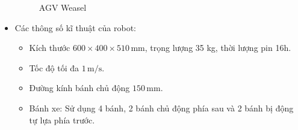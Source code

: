 \begin{itemize}
\begin{figure}[H]
                \caption{AGV Weasel}
                \label{chap1_pic12}
            \end{figure}
            \item Các thông số kĩ thuật của robot:
                \begin{itemize}[label=\textendash]
                    \item Kích thước $600 \times 400 \times 510 \,\mathrm{mm}$, trọng lượng 35 kg, thời lượng pin 16h.
                    \item Tốc độ tối đa $1 \,\mathrm{m/s}$.
                    \item Đường kính bánh chủ động $150 \,\mathrm{mm}$.
                    \item Bánh xe: Sử dụng 4 bánh, 2 bánh chủ động phía sau và 2 bánh bị động tự lựa phía trước.
                \end{itemize}
        \end{itemize}



